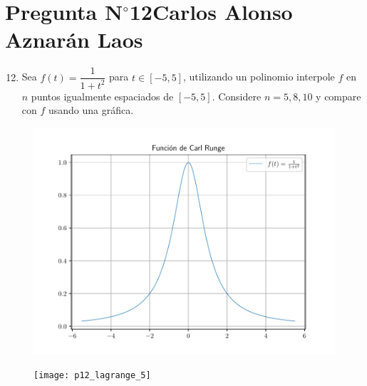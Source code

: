 \section{Pregunta N$^{\circ}$12\qquad Carlos Alonso Aznarán Laos}

\begin{frame}
    \begin{enumerate}\setcounter{enumi}{11}
        \item

              Sea
              \begin{math}
                  f\left(t\right)=
                  \dfrac{1}{1+t^{2}}
              \end{math}
              para $t\in\left[-5,5\right]$, utilizando un polinomio
              interpole $f$ en $n$ puntos igualmente espaciados de
              $\left[-5,5\right]$.
              Considere $n=5,8,10$ y compare con $f$ usando una
              gráfica.
    \end{enumerate}

    \begin{solution}
        \begin{figure}[ht!]
            \centering
            \includegraphics[width=.7\paperwidth]{p12}
        \end{figure}
    \end{solution}
\end{frame}

\begin{frame}
    \begin{solution}
        \begin{figure}[ht!]
            \centering
            \texttt{[image: p12\_lagrange\_5]}
        \end{figure}
    \end{solution}
\end{frame}

